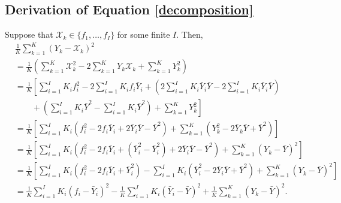 \documentclass[11pt]{article}
\theoremstyle{definition}
\theoremstyle{definition}
\begin{document}
\subsection{Derivation of Equation \ref{decomposition}}
Suppose that $\mathcal{X}_k \in \{f_1, \dots, f_I\}$ for some finite $I$. Then,
\begin{align*}
& \frac{1}{K} \sum_{k=1}^K (Y_k - \mathcal{X}_k)^2\\
 &= \frac{1}{K} \left( \sum_{k=1}^K \mathcal{X}_k^2 - 2\sum_{k=1}^KY_k\mathcal{X}_k + \sum_{k=1}^KY_k^2 \right)\\
 &= \frac{1}{K} \left[ \sum_{i=1}^I K_i f_i^2 - 2\sum_{i=1}^I K_i f_i \bar{Y}_i + \left( 2 \sum_{i=1}^IK_i\bar{Y}_i\bar{Y}- 2 \sum_{i=1}^IK_i\bar{Y}_i\bar{Y} \right) \right. \\
 &\qquad \left. {} +  \left( \sum_{i=1}^IK_i\bar{Y}^2- \sum_{i=1}^IK_i\bar{Y}^2 \right) + \sum_{k=1}^KY_k^2 \right]\\
 &= \frac{1}{K} \left[ \sum_{i=1}^I K_i \left( f_i^2 - 2 f_i \bar{Y}_i + 2 \bar{Y}_i\bar{Y}-  \bar{Y}^2 \right) + \sum_{k=1}^K(Y_k^2 -2\bar{Y}_k\bar{Y}+ \bar{Y}^2) \right]\\
 &= \frac{1}{K} \left[ \sum_{i=1}^I K_i \left( f_i^2 - 2 f_i \bar{Y}_i + (\bar{Y}_i^2 - \bar{Y}_i^2) + 2 \bar{Y}_i\bar{Y}-  \bar{Y}^2 \right) + \sum_{k=1}^K(Y_k -\bar{Y})^2 \right]\\
 &= \frac{1}{K} \left[ \sum_{i=1}^I K_i \left( f_i^2 - 2 f_i \bar{Y}_i + \bar{Y}_i^2 \right)  - \sum_{i=1}^I K_i  \left(\bar{Y}_i^2 - 2 \bar{Y}_i\bar{Y} + \bar{Y}^2 \right) + \sum_{k=1}^K(Y_k -\bar{Y})^2 \right]\\
 &=  \frac{1}{K} \sum_{i=1}^I K_i \left( f_i - \bar{Y}_i \right)^2  - \frac{1}{K} \sum_{i=1}^I K_i  \left(\bar{Y}_i - \bar{Y} \right)^2 + \frac{1}{K} \sum_{k=1}^K(Y_k -\bar{Y})^2.
\end{align*}





%

\end{document}
